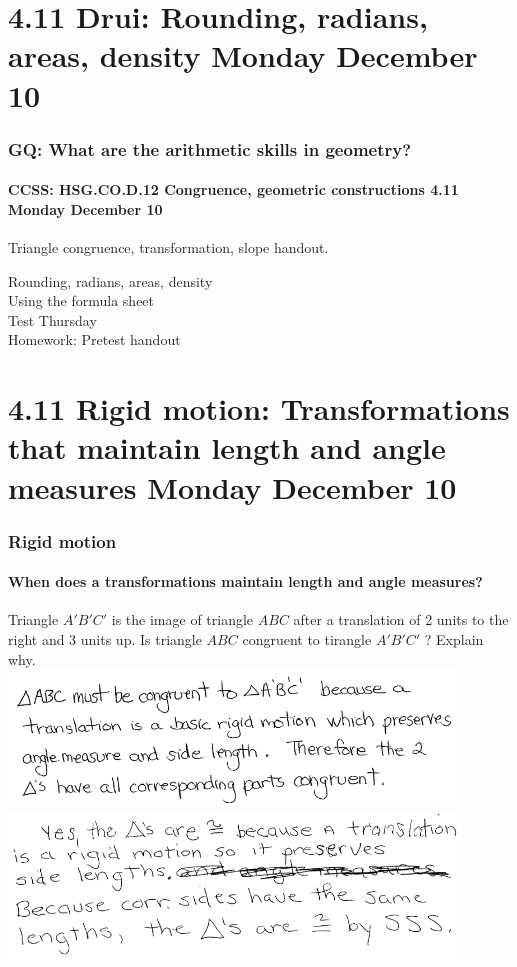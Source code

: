 \documentclass{beamer}
\begin{document}
  \section{4.11 Drui: Rounding, radians, areas, density Monday December 10}
    \frame
    {
      \frametitle{GQ: What are the arithmetic skills in geometry?}
      \framesubtitle{CCSS: HSG.CO.D.12 Congruence, geometric constructions  \alert{4.11 Monday December 10}}

      \begin{block}{Triangle congruence, transformation, slope  handout.}
      \end{block} \vspace{0.5cm}
      Rounding, radians, areas, density\\
      Using the formula sheet\\[0.5cm]
      \alert{Test Thursday} \\[0.5cm]
      Homework: Pretest handout
    }

  \section{4.11 Rigid motion: Transformations that maintain length and angle measures Monday December 10}
    \frame
    {
      \frametitle{Rigid motion}
      \framesubtitle{When does a transformations maintain length and angle measures?}

      Triangle $A'B'C'$ is the image of triangle $ABC$ after a translation of 2 units to the right and 3 units up. Is triangle $ABC$ congruent to tirangle $A'B'C'$ ? Explain why.\\[0.25cm]

      \pause \includegraphics[width=0.9\textwidth]{isometry_JN2018-25-sol.png}\\
      \pause \includegraphics[width=0.9\textwidth]{isometry_JN2018-25-sol2.png}
    }
\end{document}

